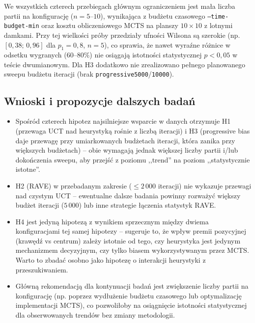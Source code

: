 \documentclass[11pt,a4paper]{article}
\begin{document}
We wszystkich czterech przebiegach głównym ograniczeniem jest mała liczba
partii na konfigurację ($n=5$--$10$), wynikająca z budżetu czasowego
\texttt{--time-budget-min} oraz kosztu obliczeniowego MCTS na planszy
$10\times10$ z lotnymi damkami. Przy tej wielkości próby przedziały ufności
Wilsona są szerokie (np. $[0{,}38;\,0{,}96]$ dla $p_1=0{,}8$, $n=5$), co
sprawia, że nawet wyraźne różnice w odsetku wygranych ($60$--$80\%$) nie
osiągają istotności statystycznej $p<0{,}05$ w teście dwumianowym. Dla H3
dodatkowo nie zrealizowano pełnego planowanego sweepu budżetu iteracji
(brak \texttt{progressive5000}/\texttt{10000}).

\subsection{Wnioski i propozycje dalszych badań}

\begin{itemize}
    \item Spośród czterech hipotez najsilniejsze wsparcie w danych
        otrzymuje H1 (przewaga UCT nad heurystyką rośnie z liczbą
        iteracji) i H3 (progressive bias daje przewagę przy umiarkowanych
        budżetach iteracji, która zanika przy większych budżetach) --
        obie wymagają jednak większej liczby partii i/lub dokończenia
        sweepu, aby przejść z poziomu ,,trend'' na poziom
        ,,statystycznie istotne''.
    \item H2 (RAVE) w przebadanym zakresie ($\leq 2\,000$ iteracji) nie
        wykazuje przewagi nad czystym UCT -- ewentualne dalsze badania
        powinny rozważyć większy budżet iteracji ($5\,000$) lub inne
        strategie łączenia statystyk RAVE.
    \item H4 jest jedyną hipotezą z wynikiem sprzecznym między dwiema
        konfiguracjami tej samej hipotezy -- sugeruje to, że wpływ premii
        pozycyjnej (krawędź vs centrum) zależy istotnie od tego, czy
        heurystyka jest jedynym mechanizmem decyzyjnym, czy tylko biasem
        wykorzystywanym przez MCTS. Warto to zbadać osobno jako hipotezę
        o interakcji heurystyki z przeszukiwaniem.
    \item Główną rekomendacją dla kontynuacji badań jest zwiększenie
        liczby partii na konfigurację (np. poprzez wydłużenie budżetu
        czasowego lub optymalizację implementacji MCTS), co pozwoliłoby
        na osiągnięcie istotności statystycznej dla obserwowanych
        trendów bez zmiany metodologii.
\end{itemize}
\end{document}

